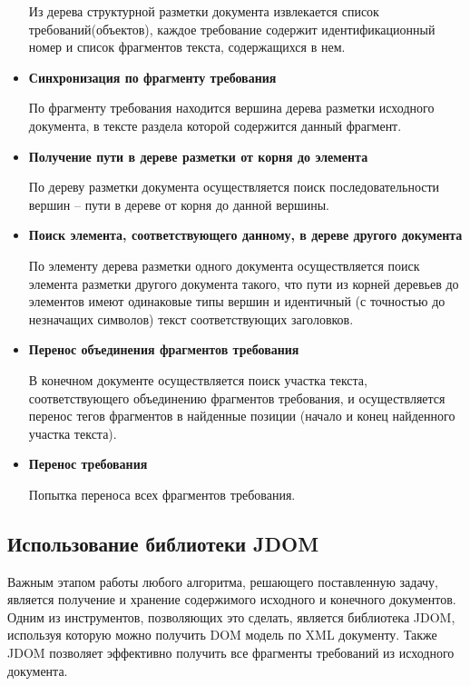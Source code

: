\begin{itemize}
Из дерева структурной разметки документа извлекается список требований(объектов), каждое требование содержит идентификационный номер и список фрагментов текста, содержащихся в нем.

\item \textbf{Синхронизация по фрагменту требования}

По фрагменту требования находится вершина дерева разметки исходного документа, в тексте раздела которой содержится данный фрагмент.

\item \textbf{Получение пути в дереве разметки от корня до элемента}

По дереву разметки документа осуществляется поиск последовательности вершин – пути в дереве от корня до данной вершины.

\item \textbf{Поиск элемента, соответствующего данному, в дереве другого документа}

По элементу дерева разметки одного документа осуществляется поиск элемента разметки другого документа такого, что пути из корней деревьев до элементов имеют одинаковые типы вершин и идентичный (с точностью до незначащих символов) текст соответствующих заголовков.

\item \textbf{Перенос объединения фрагментов требования}

В конечном документе осуществляется поиск участка текста, соответствующего объединению фрагментов требования, и осуществляется перенос тегов фрагментов в найденные позиции (начало и конец найденного участка текста).

\item \textbf{Перенос требования}

Попытка переноса всех фрагментов требования.

\end{itemize}

\subsection{Использование библиотеки JDOM}

Важным этапом работы любого алгоритма, решающего поставленную задачу, является получение и хранение содержимого исходного и конечного документов. Одним из инструментов, позволяющих это сделать, является библиотека JDOM, используя которую можно получить DOM модель по XML документу. Также JDOM позволяет эффективно получить все фрагменты требований из исходного документа.

